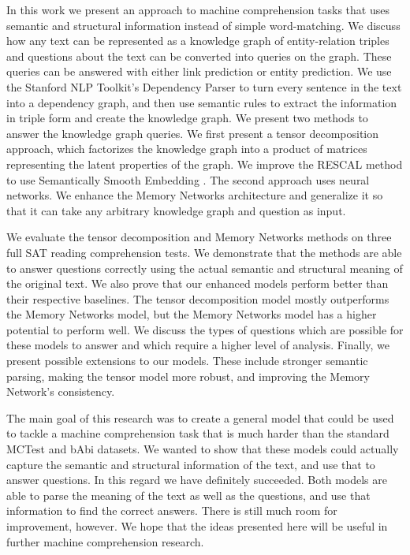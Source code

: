\documentclass[pageno]{final_paper}
\begin{document}
In this work we present an approach to machine comprehension tasks that uses
semantic and structural information instead of simple word-matching. We discuss
how any text can be represented as a knowledge graph of entity-relation triples
and questions about the text can be converted into queries on the graph. These
queries can be answered with either link prediction or entity prediction. We use
the Stanford NLP Toolkit's Dependency Parser \cite{Manning2014, Chen2014} to
turn every sentence in the text into a dependency graph, and then use semantic
rules to extract the information in triple form and create the knowledge graph.
We present two methods to answer the knowledge graph queries. We first present a
tensor decomposition approach, which factorizes the knowledge graph into a
product of matrices representing the latent properties of the graph. We improve
the RESCAL \cite{Nickel2011, Chang2014} method to use Semantically Smooth
Embedding \cite{Guo2015}. The second approach uses neural networks. We enhance
the Memory Networks \cite{Weston2015a, Sukhbaatar2015} architecture and
generalize it so that it can take any arbitrary knowledge graph and question
as input.

We evaluate the tensor decomposition and Memory Networks methods on three full
SAT reading comprehension tests. We demonstrate that the methods are able to
answer questions correctly using the actual semantic and structural meaning of
the original text. We also prove that our enhanced models perform better than
their respective baselines. The tensor decomposition model mostly outperforms
the Memory Networks model, but the Memory Networks model has a higher potential
to perform well. We discuss the types of questions which are possible for these
models to answer and which require a higher level of analysis. Finally, we
present possible extensions to our models. These include stronger semantic
parsing, making the tensor model more robust, and improving the Memory Network's
consistency.

The main goal of this research was to create a general model that could be used
to tackle a machine comprehension task that is much harder than the standard
MCTest \cite{Richardson2013} and bAbi \cite{Weston2015} datasets. We wanted to
show that these models could actually capture the semantic and structural
information of the text, and use that to answer questions. In this regard we
have definitely succeeded. Both models are able to parse the meaning of the text
as well as the questions, and use that information to find the correct answers.
There is still much room for improvement, however. We hope that the ideas
presented here will be useful in further machine comprehension research.
\end{document}
